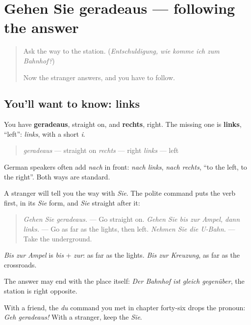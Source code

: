 \section[Gehen Sie geradeaus, dann links]{Gehen Sie geradeaus — following the answer}

\label{lesson:GE-C256-links}



\begin{quote}
Ask the way to the station. (\emph{Entschuldigung, wie komme ich zum Bahnhof?})

Now the stranger answers, and you have to follow.
\end{quote}

\subsection*{You'll want to know: links}
You have \textbf{geradeaus}, straight on, and \textbf{rechts}, right. The missing one is \textbf{links}, \textquotedblleft{}left\textquotedblright{}: \emph{links}, with a short \emph{i}.

\begin{quote}
\emph{geradeaus} — straight on \emph{rechts} — right \emph{links} — left
\end{quote}

German speakers often add \emph{nach} in front: \emph{nach links}, \emph{nach rechts}, \textquotedblleft{}to the left, to the right\textquotedblright{}. Both ways are standard.

\begin{grammarlens}[title={Grammar Lens: the Sie command, verb first}]
A stranger will tell you the way with \emph{Sie}. The polite command puts the verb first, in its \emph{Sie} form, and \emph{Sie} straight after it:

\begin{quote}
\emph{Gehen Sie geradeaus.} — Go straight on. \emph{Gehen Sie bis zur Ampel, dann links.} — Go as far as the lights, then left. \emph{Nehmen Sie die U-Bahn.} — Take the underground.
\end{quote}

\emph{Bis zur Ampel} is \emph{bis} + \emph{zur}: as far as the lights. \emph{Bis zur Kreuzung}, as far as the crossroads.

The answer may end with the place itself: \emph{Der Bahnhof ist gleich gegenüber}, the station is right opposite.

With a friend, the \emph{du} command you met in chapter forty-six drops the pronoun: \emph{Geh geradeaus!} With a stranger, keep the \emph{Sie}.
\end{grammarlens}

